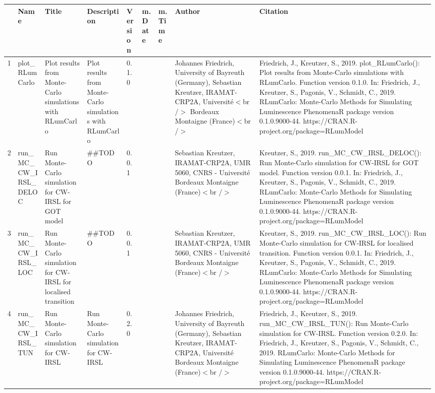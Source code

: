 \begin{table}[ht]
\centering
\begin{tabular}{rllllllll}
  \hline
 & Name & Title & Description & Version & m.Date & m.Time & Author & Citation \\ 
  \hline
1 & plot\_RLumCarlo & Plot results from Monte-Carlo simulations with RLumCarlo & Plot results from Monte-Carlo simulations with RLumCarlo & 0.1.0
 &  &  & Johannes Friedrich, University of Bayreuth (Germany), Sebastian Kreutzer, IRAMAT-CRP2A, Université$<$br /$>$ Bordeaux Montaigne (France)$<$br /$>$ & Friedrich, J., Kreutzer, S., 2019. plot\_RLumCarlo(): Plot results from Monte-Carlo simulations with RLumCarlo. Function version 0.1.0. In: Friedrich, J., Kreutzer, S., Pagonis, V., Schmidt, C., 2019. RLumCarlo: Monte-Carlo Methods for Simulating Luminescence PhenomenaR package version 0.1.0.9000-44. https://CRAN.R-project.org/package=RLumModel
 \\ 
  2 & run\_MC\_CW\_IRSL\_DELOC & Run Monte-Carlo simulation for CW-IRSL for GOT model & \#\#TODO & 0.0.1
 &  &  & Sebastian Kreutzer, IRAMAT-CRP2A, UMR 5060, CNRS - Université Bordeaux Montaigne (France)$<$br /$>$ & Kreutzer, S., 2019. run\_MC\_CW\_IRSL\_DELOC(): Run Monte-Carlo simulation for CW-IRSL for GOT model. Function version 0.0.1. In: Friedrich, J., Kreutzer, S., Pagonis, V., Schmidt, C., 2019. RLumCarlo: Monte-Carlo Methods for Simulating Luminescence PhenomenaR package version 0.1.0.9000-44. https://CRAN.R-project.org/package=RLumModel
 \\ 
  3 & run\_MC\_CW\_IRSL\_LOC & Run Monte-Carlo simulation for CW-IRSL for localised transition & \#\#TODO & 0.0.1
 &  &  & Sebastian Kreutzer, IRAMAT-CRP2A, UMR 5060, CNRS - Université Bordeaux Montaigne (France)$<$br /$>$ & Kreutzer, S., 2019. run\_MC\_CW\_IRSL\_LOC(): Run Monte-Carlo simulation for CW-IRSL for localised transition. Function version 0.0.1. In: Friedrich, J., Kreutzer, S., Pagonis, V., Schmidt, C., 2019. RLumCarlo: Monte-Carlo Methods for Simulating Luminescence PhenomenaR package version 0.1.0.9000-44. https://CRAN.R-project.org/package=RLumModel
 \\ 
  4 & run\_MC\_CW\_IRSL\_TUN & Run Monte-Carlo simulation for CW-IRSL & Run Monte-Carlo simulation for CW-IRSL & 0.2.0
 &  &  & Johannes Friedrich, University of Bayreuth (Germany), Sebastian Kreutzer, IRAMAT-CRP2A, Université Bordeaux Montaigne (France)$<$br /$>$ & Friedrich, J., Kreutzer, S., 2019. run\_MC\_CW\_IRSL\_TUN(): Run Monte-Carlo simulation for CW-IRSL. Function version 0.2.0. In: Friedrich, J., Kreutzer, S., Pagonis, V., Schmidt, C., 2019. RLumCarlo: Monte-Carlo Methods for Simulating Luminescence PhenomenaR package version 0.1.0.9000-44. https://CRAN.R-project.org/package=RLumModel

\end{tabular}
\end{table}
